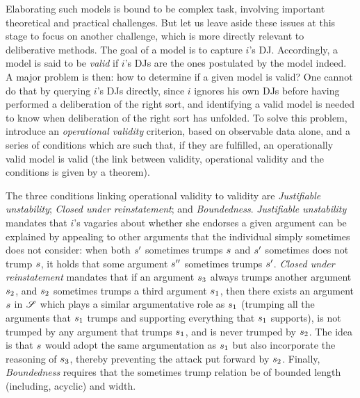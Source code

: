 \documentclass[version=3.21, pagesize, twoside=off, bibliography=totoc, DIV=calc, fontsize=12pt, a4paper, french, english]{scrartcl}
\begin{document}
Elaborating such models is bound to be complex task, involving important theoretical and practical challenges. But let us leave aside these issues at this stage to focus on another challenge, which is more directly relevant to deliberative methods. 
The goal of a model is to capture $i$'s \ac{DJ}. Accordingly, a model is said to be \emph{valid} if $i$’s \acp{DJ} are the ones postulated by the model indeed. A major problem is then: how to determine if a given model is valid?
One cannot do that by querying $i$'s \acp{DJ} directly, since $i$ ignores his own \acp{DJ} before having performed a deliberation of the right sort, and identifying a valid model is needed to know when deliberation of the right sort has unfolded. To solve this problem, \citet{cailloux_formal_2019} introduce an \emph{operational validity} criterion, based on observable data alone, and a series of conditions which are such that, if they are fulfilled, an operationally valid model is valid (the link between validity, operational validity and the conditions is given by a theorem).

The three conditions linking operational validity to validity are \emph{Justifiable unstability}; \emph{Closed under reinstatement}; and \emph{Boundedness}. \emph{Justifiable unstability} mandates that $i$'s vagaries about whether she endorses a given argument can be explained by appealing to other arguments that the individual simply sometimes does not consider: when both $s'$ sometimes trumps $s$ and $s'$ sometimes does not trump $s$, it holds that some argument $s''$ sometimes trumps $s'$. 
\emph{Closed under reinstatement} mandates that if an argument $s_3$ always trumps another argument $s_2$, and $s_2$ sometimes trumps a third argument $s_1$, then there exists an argument $s$ in $\mathscr{S}$ which plays a similar argumentative role as $s_1$ (trumping all the arguments that $s_1$ trumps and supporting everything that $s_1$ supports), is not trumped by any argument that trumps $s_1$, and is never trumped by $s_2$. The idea is that $s$ would adopt the same argumentation as $s_1$ but also incorporate the reasoning of $s_3$, thereby preventing the attack put forward by $s_2$. 
Finally, \emph{Boundedness} requires that the sometimes trump relation be of bounded length (including, acyclic) and width.
\end{document}
